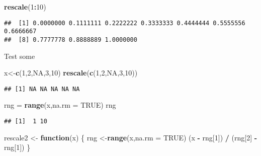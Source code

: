 \documentclass[]{article}
\newenvironment{Shaded}{\begin{snugshade}}{\end{snugshade}}
\newcommand{\KeywordTok}[1]{\textcolor[rgb]{0.13,0.29,0.53}{\textbf{#1}}}
\newcommand{\DataTypeTok}[1]{\textcolor[rgb]{0.13,0.29,0.53}{#1}}
\newcommand{\DecValTok}[1]{\textcolor[rgb]{0.00,0.00,0.81}{#1}}
\newcommand{\StringTok}[1]{\textcolor[rgb]{0.31,0.60,0.02}{#1}}
\newcommand{\OtherTok}[1]{\textcolor[rgb]{0.56,0.35,0.01}{#1}}
\newcommand{\ControlFlowTok}[1]{\textcolor[rgb]{0.13,0.29,0.53}{\textbf{#1}}}
\newcommand{\OperatorTok}[1]{\textcolor[rgb]{0.81,0.36,0.00}{\textbf{#1}}}
\newcommand{\NormalTok}[1]{#1}
\begin{document}
\begin{Shaded}
\begin{Highlighting}[]
\KeywordTok{rescale}\NormalTok{(}\DecValTok{1}\OperatorTok{:}\DecValTok{10}\NormalTok{)}
\end{Highlighting}
\end{Shaded}

\begin{verbatim}
##  [1] 0.0000000 0.1111111 0.2222222 0.3333333 0.4444444 0.5555556 0.6666667
##  [8] 0.7777778 0.8888889 1.0000000
\end{verbatim}

Test some

\begin{Shaded}
\begin{Highlighting}[]
\NormalTok{x<-}\KeywordTok{c}\NormalTok{(}\DecValTok{1}\NormalTok{,}\DecValTok{2}\NormalTok{,}\OtherTok{NA}\NormalTok{,}\DecValTok{3}\NormalTok{,}\DecValTok{10}\NormalTok{)}
\KeywordTok{rescale}\NormalTok{(}\KeywordTok{c}\NormalTok{(}\DecValTok{1}\NormalTok{,}\DecValTok{2}\NormalTok{,}\OtherTok{NA}\NormalTok{,}\DecValTok{3}\NormalTok{,}\DecValTok{10}\NormalTok{))}
\end{Highlighting}
\end{Shaded}

\begin{verbatim}
## [1] NA NA NA NA NA
\end{verbatim}

\begin{Shaded}
\begin{Highlighting}[]
\NormalTok{rng =}\StringTok{ }\KeywordTok{range}\NormalTok{(x,}\DataTypeTok{na.rm =} \OtherTok{TRUE}\NormalTok{)}
\NormalTok{rng}
\end{Highlighting}
\end{Shaded}

\begin{verbatim}
## [1]  1 10
\end{verbatim}

\begin{Shaded}
\begin{Highlighting}[]
\NormalTok{rescale2 <-}\StringTok{ }\ControlFlowTok{function}\NormalTok{(x) \{}
\NormalTok{   rng <-}\KeywordTok{range}\NormalTok{(x,}\DataTypeTok{na.rm =} \OtherTok{TRUE}\NormalTok{)}
\NormalTok{   (x }\OperatorTok{-}\StringTok{ }\NormalTok{rng[}\DecValTok{1}\NormalTok{]) }\OperatorTok{/}\StringTok{ }\NormalTok{(rng[}\DecValTok{2}\NormalTok{] }\OperatorTok{-}\StringTok{ }\NormalTok{rng[}\DecValTok{1}\NormalTok{])}
\NormalTok{\}}
\end{Highlighting}
\end{Shaded}
\end{document}
